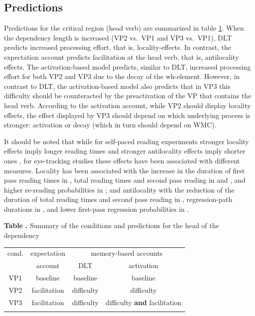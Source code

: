 \documentclass{frontiersSCNS}\usepackage{knitr}
\begin{document}
\subsection{Predictions}
Predictions for the critical region (head verb) are summarized in table \ref{tab:predictions}. When the dependency length is increased (VP2 vs.\ VP1 and VP3 vs.\ VP1), DLT predicts increased processing effort, that is, locality-effects. In contrast, the expectation account predicts facilitation at the head verb, that is, antilocality effects. The activation-based model predicts, similar to DLT, increased processing effort for both VP2 and VP3 due to the decay of the wh-element. However, in contrast to DLT, the activation-based model also predicts that in VP3 this difficulty should be counteracted by the preactivation of the VP that contains the head verb. According to the activation account, while VP2 should display locality effects, the effect displayed by VP3 should depend on which underlying process is stronger: activation or decay (which in turn should depend on WMC). 

It should be noted  that while for self-paced reading experiments stronger locality effects imply longer reading times \citep{Gibson2000,GrodnerGibson2005,BartekEtAl2011} and stronger antilocality effects imply shorter ones \citep{Konieczny2000,Levy2008,VasishthLewis2006}, for eye-tracking studies these effects have been associated with different measures. Locality has been associated with the increase in the duration of  first pass reading times in \citet{Staub2010}, total reading times and second pass reading in \citet{LevyKeller2012} and \citet{BartekEtAl2011}, and higher re-reading probabilities in \citet{VasishthDrenhaus2011}; and antilocality with the reduction of the duration of total reading times and second pass reading in  \citet{LevyKeller2012}, regression-path durations in \citet{KoniecznyDoering2003}, and lower first-pass regression probabilities in \citet{VasishthDrenhaus2011}.
 


\begin{table}[h]
\textbf{\label{tab:predictions} Table .}{ Summary of the conditions and predictions for the head of the dependency }

\processtable{ }
{\begin{tabular}{ c c c c }
\toprule
cond. & expectation & \multicolumn{2}{c}{memory-based accounts} \\
 
        &     account  & DLT    &   activation \\
\midrule
VP1 & baseline & baseline & baseline \\ 
VP2 & facilitation & difficulty & difficulty \\ 
VP3 & facilitation & difficulty & difficulty \textbf{and} facilitation  \\ 
\botrule
\end{tabular}}{}
\end{table}
\end{document}
